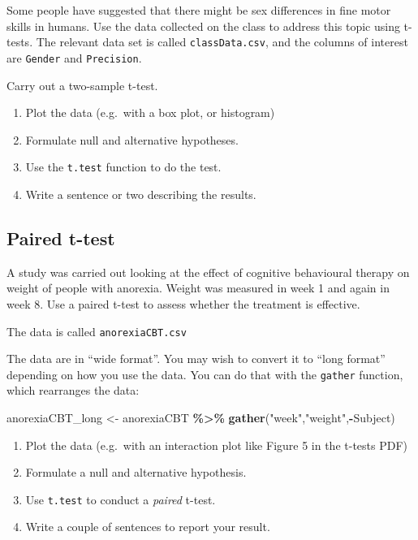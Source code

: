 \documentclass[
  a4paperpaper,
]{book}
\newenvironment{Shaded}{\begin{snugshade}}{\end{snugshade}}
\newcommand{\KeywordTok}[1]{\textcolor[rgb]{0.13,0.29,0.53}{\textbf{#1}}}
\newcommand{\NormalTok}[1]{#1}
\newcommand{\OperatorTok}[1]{\textcolor[rgb]{0.81,0.36,0.00}{\textbf{#1}}}
\newcommand{\StringTok}[1]{\textcolor[rgb]{0.31,0.60,0.02}{#1}}
\begin{document}
Some people have suggested that there might be sex differences in fine motor skills in humans. Use the data collected on the class to address this topic using t-tests. The relevant data set is called \texttt{classData.csv}, and the columns of interest are \texttt{Gender} and \texttt{Precision}.

Carry out a two-sample t-test.

\begin{enumerate}
\def\labelenumi{\arabic{enumi})}
\item
  Plot the data (e.g.~with a box plot, or histogram)
\item
  Formulate null and alternative hypotheses.
\item
  Use the \texttt{t.test} function to do the test.
\item
  Write a sentence or two describing the results.
\end{enumerate}

\hypertarget{paired-t-test-1}{%
\subsection{Paired t-test}\label{paired-t-test-1}}

A study was carried out looking at the effect of cognitive behavioural therapy on weight of people with anorexia. Weight was measured in week 1 and again in week 8. Use a paired t-test to assess whether the treatment is effective.

The data is called \texttt{anorexiaCBT.csv}

The data are in ``wide format''. You may wish to convert it to ``long format'' depending on how you use the data. You can do that with the \texttt{gather} function, which rearranges the data:

\begin{Shaded}
\begin{Highlighting}[]
\NormalTok{anorexiaCBT\_long \textless{}{-}}\StringTok{ }\NormalTok{anorexiaCBT }\OperatorTok{\%\textgreater{}\%}\StringTok{ }
\StringTok{  }\KeywordTok{gather}\NormalTok{(}\StringTok{"week"}\NormalTok{,}\StringTok{"weight"}\NormalTok{,}\OperatorTok{{-}}\NormalTok{Subject)}
\end{Highlighting}
\end{Shaded}

\begin{enumerate}
\def\labelenumi{\arabic{enumi})}
\item
  Plot the data (e.g.~with an interaction plot like Figure 5 in the t-tests PDF)
\item
  Formulate a null and alternative hypothesis.
\item
  Use \texttt{t.test} to conduct a \emph{paired} t-test.
\item
  Write a couple of sentences to report your result.
\end{enumerate}
\end{document}
